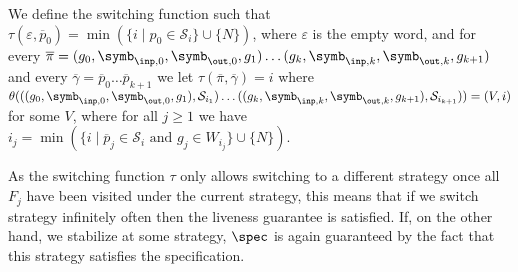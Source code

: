 We define the switching function such that 
$\tau (\varepsilon,\overline p_0) = \min(\{i \mid p_0 \in \mathcal S_i\}\cup \{N\})$, where $\varepsilon$ is the empty word, and for every 
$\overline \pi =(g_0,\symb_{\inp,0},\symb_{\out,0}, g_1) \ldots
(g_k,\symb_{\inp,k}, \symb_{\out,k}, g_{k+1})$ and every $\overline \gamma = \overline p_0\ldots\overline p_{k+1}$ we let
$\tau (\overline \pi, \overline\gamma) = i$ where
$\theta(((g_0,\symb_{\inp,0},\symb_{\out,0}, g_1),\mathcal S_{i_1}) \ldots
((g_k,\symb_{\inp,k}, \symb_{\out,k}, g_{k+1}),\mathcal S_{i_{k+1}})) = (V,i)$ for some $V$, where for all $j\geq 1$ we have $i_j  = \min(\{i \mid \overline p_j \in \mathcal S_i\text{ and }g_j \in W_{i_j}\} \cup \{N\})$.

As the switching function $\tau$ only allows switching to a different strategy once all $F_j$ have been visited under the current strategy, this means that if we switch strategy infinitely often then the liveness guarantee is satisfied. If, on the other hand, we stabilize at some strategy, $\spec$ is again guaranteed by the fact that this strategy satisfies the specification. 
